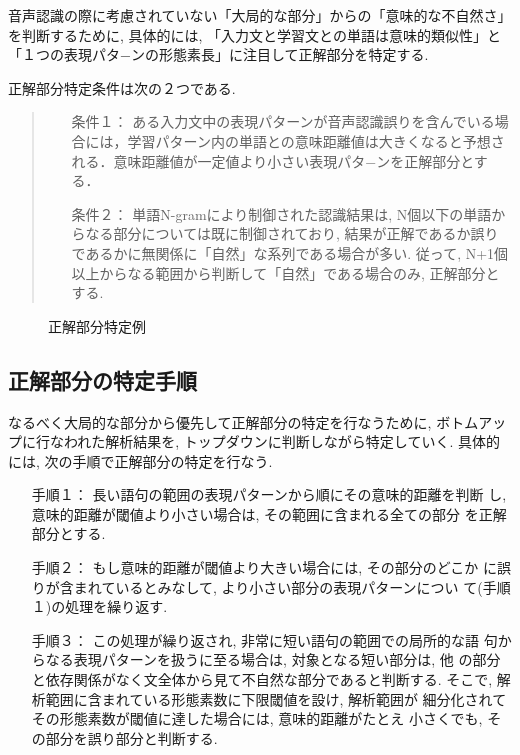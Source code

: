 音声認識の際に考慮されていない「大局的な部分」からの「意味的な不自然さ」を判断するために, 具体的には, 「入力文と学習文との単語は意味的類似性」と「１つの表現パタ−ンの形態素長」に注目して正解部分を特定する. 

正解部分特定条件は次の２つである. 
\vspace{0.5cm}

\begin{quote}
\begin{itemize}
\item[条件１：] ある入力文中の表現パターンが音声認識誤りを含んでいる場合には，学習パターン内の単語との意味距離値は大きくなると予想される．意味距離値が一定値より小さい表現パタ−ンを正解部分とする．
\item[条件２：] 単語N-gramにより制御された認識結果は, N個以下の単語からなる部分については既に制御されており, 結果が正解であるか誤りであるかに無関係に「自然」な系列である場合が多い. 従って, N+1個以上からなる範囲から判断して「自然」である場合のみ, 正解部分とする. 
\end{itemize}
\end{quote}
\vspace{0.5cm}

\begin{figure}
 \begin{center}
 \end{center}
\vspace{-4mm}
 \caption{正解部分特定例}
 \label{fig:example}
\end{figure}


\subsection{正解部分の特定手順}

なるべく大局的な部分から優先して正解部分の特定を行なうために, ボトムアップに行なわれた解析結果を, トップダウンに判断しながら特定していく. 
具体的には, 次の手順で正解部分の特定を行なう. 

\vspace{0.5cm}

\begin{itemize}

\item [手順１：]長い語句の範囲の表現パターンから順にその意味的距離を判断
      し, 意味的距離が閾値より小さい場合は, その範囲に含まれる全ての部分
      を正解部分とする. 

\item [手順２：]もし意味的距離が閾値より大きい場合には, その部分のどこか
      に誤りが含まれているとみなして, より小さい部分の表現パターンについ
      て(手順１)の処理を繰り返す. 
\item [手順３：]この処理が繰り返され, 非常に短い語句の範囲での局所的な語
      句からなる表現パターンを扱うに至る場合は, 対象となる短い部分は, 他
      の部分と依存関係がなく文全体から見て不自然な部分であると判断する. 
      そこで, 解析範囲に含まれている形態素数に下限閾値を設け, 解析範囲が
      細分化されてその形態素数が閾値に達した場合には, 意味的距離がたとえ
      小さくでも, その部分を誤り部分と判断する. 
\end{itemize}
\vspace{0.5cm}

